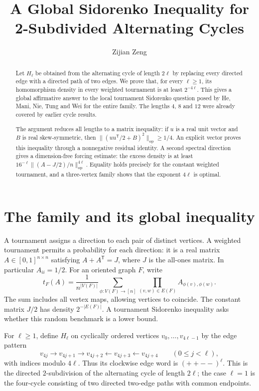 \documentclass[acmsmall,screen,nonacm,11pt]{acmart}
\title[A global Sidorenko inequality for subdivided cycles]{A Global Sidorenko Inequality for\texorpdfstring{\\}{ }2-Subdivided Alternating Cycles}
\author{Zijian Zeng}
\affiliation{\normalsize\institution{UCSI University}\city{Kuala Lumpur}\country{Malaysia}}
\date{}
\newcommand{\op}{\mathrm{op}}
\newcommand{\norm}[1]{\lVert #1\rVert}
\begin{document}
\begin{abstract}
\normalsize
Let $H_\ell$ be obtained from the alternating cycle of length $2\ell$ by replacing every directed edge with a directed path of two edges. We prove that, for every $\ell\geq 1$, its homomorphism density in every weighted tournament is at least $2^{-4\ell}$. This gives a global affirmative answer to the local tournament Sidorenko question posed by He, Mani, Nie, Tung and Wei for the entire family. The lengths $4$, $8$ and $12$ were already covered by earlier cycle results.

The argument reduces all lengths to a matrix inequality: if $u$ is a real unit vector and $B$ is real skew-symmetric, then $\norm{(uu^{\mathsf T}/2+B)^2}_{\op}\geq 1/4$. An explicit vector proves this inequality through a nonnegative residual identity. A second spectral direction gives a dimension-free forcing estimate: the excess density is at least $16^{-\ell}\norm{(A-J/2)/n}_{\op}^{4\ell}$. Equality holds precisely for the constant weighted tournament, and a three-vertex family shows that the exponent $4\ell$ is optimal.
\end{abstract}
\maketitle
\raggedbottom
\clearpage

\section{The family and its global inequality}

A tournament assigns a direction to each pair of distinct vertices. A weighted tournament permits a probability for each direction: it is a real matrix $A\in[0,1]^{n\times n}$ satisfying $A+A^{\mathsf T}=J$, where $J$ is the all-ones matrix. In particular $A_{ii}=1/2$. For an oriented graph $F$, write
\begin{equation}\label{eq:density}
 t_F(A)=\frac{1}{n^{|V(F)|}}\sum_{\phi:V(F)\to[n]}
       \prod_{(v,w)\in E(F)} A_{\phi(v),\phi(w)}.
\end{equation}
The sum includes all vertex maps, allowing vertices to coincide. The constant matrix $J/2$ has density $2^{-|E(F)|}$. A tournament Sidorenko inequality asks whether this random benchmark is a lower bound.

For $\ell\geq1$, define $H_\ell$ on cyclically ordered vertices $v_0,\ldots,v_{4\ell-1}$ by the edge pattern
\[
  v_{4j}\longrightarrow v_{4j+1}\longrightarrow v_{4j+2}
  \longleftarrow v_{4j+3}\longleftarrow v_{4j+4}
  \qquad(0\leq j<\ell),
\]
with indices modulo $4\ell$. Thus its clockwise edge word is $(++--)^\ell$. This is the directed $2$-subdivision of the alternating cycle of length $2\ell$; the case $\ell=1$ is the four-cycle consisting of two directed two-edge paths with common endpoints.
\end{document}
